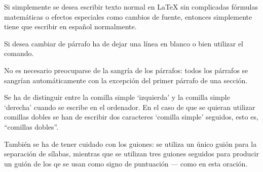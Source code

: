 \documentclass[a4paper,10pt]{letter}
\begin{document}
Si simplemente se desea escribir texto normal en LaTeX
sin complicadas f\'ormulas matem\'aticas o efectos especiales
como cambios de fuente, entonces simplemente tiene que escribir 
en espa\~nol normalmente. \par
Si desea cambiar de párrafo ha de dejar una línea en blanco o bien
utilizar el comando. \par
No es necesario preocuparse de la sangría de los párrafos:
todos los párrafos se sangrían automáticamente con la excepción 
del primer párrafo de una sección.

Se ha de distinguir entre la comilla simple `izquierda' 
y la comilla simple `derecha' cuando se escribe en el ordenador.
En el caso de que se quieran utilizar comillas dobles se han de 
escribir dos caracteres  `comilla simple' seguidos, esto es,
``comillas dobles''.

También se ha de tener cuidado con los guiones: se utiliza un único
guión para la separación de sílabas, mientras que se utilizan 
tres guiones seguidos para producir un guión de los qe se usan 
como signo de puntuación --- como en esta oración.
\end{document}
